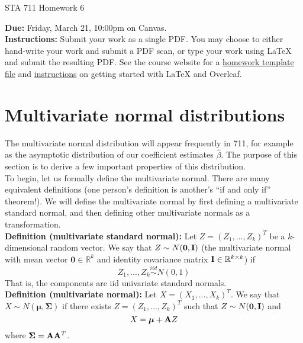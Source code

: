 \documentclass[11pt]{article}
\begin{document}
\begin{center}
\Large
STA 711 Homework 6\\
\normalsize
\vspace{5mm}
\end{center}

\noindent \textbf{Due:} Friday, March 21, 10:00pm on Canvas.\\ 

\noindent \textbf{Instructions:} Submit your work as a single PDF. You may choose to either hand-write your work and submit a PDF scan, or type your work using LaTeX and submit the resulting PDF. See the course website for a \href{https://sta711-s25.github.io/homework/hw_template.tex}{homework template file} and \href{https://sta711-s25.github.io/homework/latex_instructions/}{instructions} on getting started with LaTeX and Overleaf.

\section*{Multivariate normal distributions}

\noindent The multivariate normal distribution will appear frequently in 711, for example as the asymptotic distribution of our coefficient estimates $\widehat{\beta}$. The purpose of this section is to derive a few important properties of this distribution.\\

\noindent To begin, let us formally define the multivariate normal. There are many equivalent definitions (one person's definition is another's ``if and only if'' theorem!). We will define the multivariate normal by first defining a multivariate standard normal, and then defining other multivariate normals as a transformation.\\

\noindent \textbf{Definition (multivariate standard normal):} Let $Z = (Z_1,...,Z_k)^T$ be a $k$-dimensional random vector. We say that $Z \sim N(\bm{0}, {\bf I})$ (the multivariate normal with mean vector $\bm{0} \in \mathbb{R}^k$ and identity covariance matrix ${\bf I} \in \mathbb{R}^{k \times k}$) if
$$Z_1,...,Z_k \overset{iid}{\sim} N(0, 1)$$
That is, the components are iid univariate standard normals.\\

\noindent \textbf{Definition (multivariate normal):} Let $X = (X_1,...,X_k)^T$. We say that $X \sim N(\bm{\mu}, \bm{\Sigma})$ if there exists $Z = (Z_1,...,Z_k)^T$ such that $Z \sim N(\bm{0}, {\bf I})$ and
$$X =\bm{\mu} + {\bf A} Z$$
where $\bm{\Sigma} = {\bf A} {\bf A}^T$.\\
\end{document}
